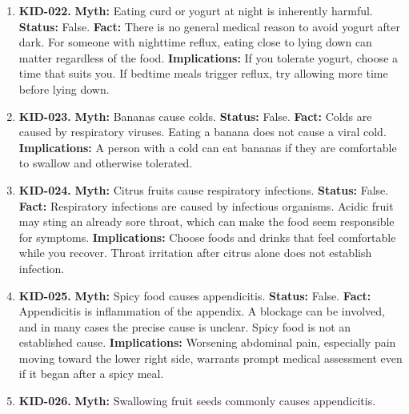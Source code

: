 \documentclass[11pt,oneside]{book}
\begin{document}
\begin{enumerate}[leftmargin=0pt,labelwidth=0pt,labelsep=0pt,itemindent=0pt]
\textbf{Implications:} New pale patches can have several causes. Seek assessment instead of eliminating the food combination solely to prevent vitiligo.
\item[] \textbf{KID-022.} \textbf{Myth:} Eating curd or yogurt at night is inherently harmful.\newline
\textbf{Status:} False.\newline
\textbf{Fact:} There is no general medical reason to avoid yogurt after dark. For someone with nighttime reflux, eating close to lying down can matter regardless of the food. \cite{ref352}\newline
\textbf{Implications:} If you tolerate yogurt, choose a time that suits you. If bedtime meals trigger reflux, try allowing more time before lying down.
\item[] \textbf{KID-023.} \textbf{Myth:} Bananas cause colds.\newline
\textbf{Status:} False.\newline
\textbf{Fact:} Colds are caused by respiratory viruses. Eating a banana does not cause a viral cold. \cite{ref4}\newline
\textbf{Implications:} A person with a cold can eat bananas if they are comfortable to swallow and otherwise tolerated.
\item[] \textbf{KID-024.} \textbf{Myth:} Citrus fruits cause respiratory infections.\newline
\textbf{Status:} False.\newline
\textbf{Fact:} Respiratory infections are caused by infectious organisms. Acidic fruit may sting an already sore throat, which can make the food seem responsible for symptoms. \cite{ref4}\newline
\textbf{Implications:} Choose foods and drinks that feel comfortable while you recover. Throat irritation after citrus alone does not establish infection.
\item[] \textbf{KID-025.} \textbf{Myth:} Spicy food causes appendicitis.\newline
\textbf{Status:} False.\newline
\textbf{Fact:} Appendicitis is inflammation of the appendix. A blockage can be involved, and in many cases the precise cause is unclear. Spicy food is not an established cause. \cite{ref353}\newline
\textbf{Implications:} Worsening abdominal pain, especially pain moving toward the lower right side, warrants prompt medical assessment even if it began after a spicy meal.
\item[] \textbf{KID-026.} \textbf{Myth:} Swallowing fruit seeds commonly causes appendicitis.\newline

\end{enumerate}
\end{document}
